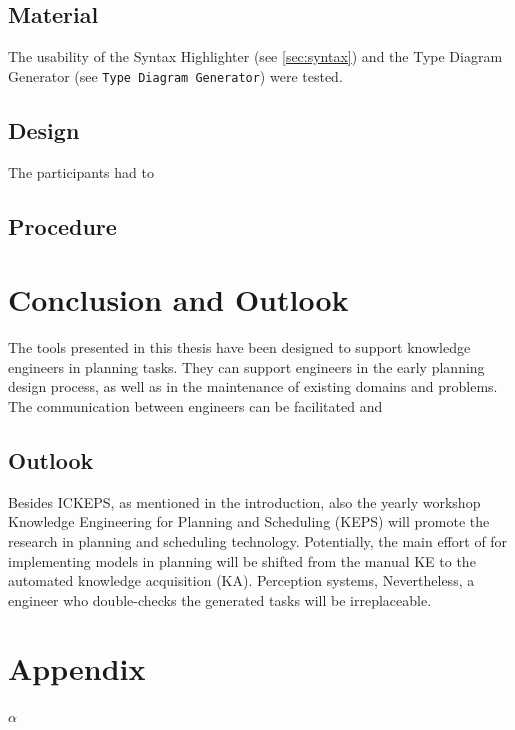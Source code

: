 \documentclass[11pt]{report}
\begin{document}
\section{Material}
\label{sec-5-2}
The usability of the Syntax Highlighter (see \ref{sec:syntax}) and the Type
Diagram Generator (see \texttt{Type Diagram Generator}) were
tested.
\section{Design}
\label{sec-5-3}

The participants had to 

\section{Procedure}
\label{sec-5-4}
\chapter{Conclusion and Outlook}
\label{sec-6}
The tools presented in this thesis have been designed to support
knowledge engineers in planning tasks. They can support engineers in
the early planning design process, as well as in the maintenance of
existing domains and problems. The communication between engineers can
be facilitated and 


\section{Outlook}
\label{sec-6-1}
Besides ICKEPS, as mentioned in the introduction, also the yearly
workshop Knowledge Engineering for Planning and Scheduling (KEPS) will
promote the research in planning and scheduling technology. Potentially, the main effort of
for implementing models in planning will be shifted from the manual KE
to the automated knowledge acquisition (KA). Perception systems,
Nevertheless, a engineer who double-checks the generated tasks will be
irreplaceable.  
\printbibliography

\chapter{Appendix}
\label{sec-7}
\(\alpha\)
\end{document}
